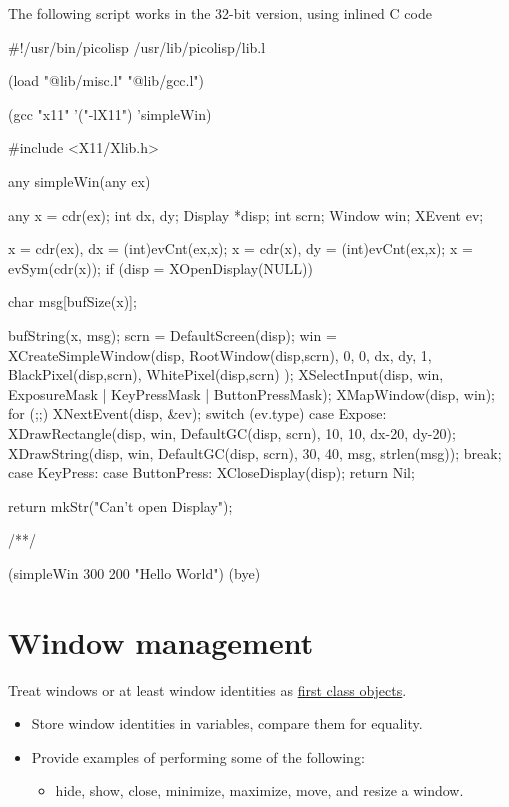 \begin{wideverbatim}

The following script works in the 32-bit version, using inlined C code

#!/usr/bin/picolisp /usr/lib/picolisp/lib.l

(load "@lib/misc.l" "@lib/gcc.l")

(gcc "x11" '("-lX11") 'simpleWin)

#include <X11/Xlib.h>

any simpleWin(any ex) {
   any x = cdr(ex);
   int dx, dy;
   Display *disp;
   int scrn;
   Window win;
   XEvent ev;

   x = cdr(ex),  dx = (int)evCnt(ex,x);
   x = cdr(x),  dy = (int)evCnt(ex,x);
   x = evSym(cdr(x));
   if (disp = XOpenDisplay(NULL)) {
      char msg[bufSize(x)];

      bufString(x, msg);
      scrn = DefaultScreen(disp);
      win = XCreateSimpleWindow(disp, RootWindow(disp,scrn), 0, 0, dx, dy,
                           1, BlackPixel(disp,scrn), WhitePixel(disp,scrn) );
      XSelectInput(disp, win, ExposureMask | KeyPressMask | ButtonPressMask);
      XMapWindow(disp, win);
      for (;;) {
         XNextEvent(disp, \&ev);
         switch (ev.type) {
         case Expose:
            XDrawRectangle(disp, win, DefaultGC(disp, scrn), 10, 10, dx-20, dy-20);
            XDrawString(disp, win, DefaultGC(disp, scrn), 30, 40, msg, strlen(msg));
            break;
         case KeyPress:
         case ButtonPress:
            XCloseDisplay(disp);
            return Nil;
         }
      }
   }
   return mkStr("Can't open Display");
}
/**/

(simpleWin 300 200 "Hello World")
(bye)

\end{wideverbatim}

\pagebreak{}
\section*{Window management}

Treat windows or at least window identities as
\href{http://en.wikipedia.org/wiki/First-class\_object}{first class
objects}.

\begin{itemize}
\item
  Store window identities in variables, compare them for equality.
\item
  Provide examples of performing some of the following:

  \begin{itemize}
  \item
    hide, show, close, minimize, maximize, move, and resize a window.
  \end{itemize}
\end{itemize}

